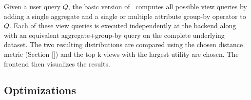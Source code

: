 Given a user query $Q$, the basic version of \SeeDB\ computes all possible view
queries by adding a single aggregate and a single or multiple attribute group-by
operator to $Q$. Each of these view queries is executed independently at the
backend along with an equivalent aggregate+group-by query on the complete
underlying dataset. The two resulting distributions are compared using the
chosen distance metric (Section \ref{}) and the top k views with the largest
utility are chosen. The frontend then visualizes the results. 
% 
% 
% 

\subsection{Optimizations}
\label{optimizations}

